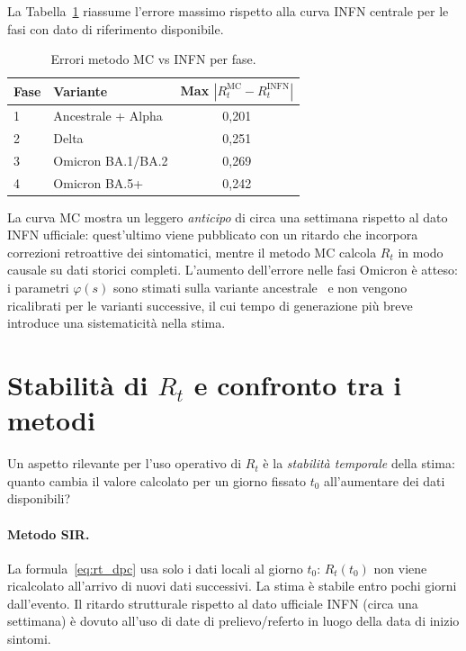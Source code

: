 \documentclass[12pt, a4paper]{article}
\begin{document}
La Tabella~\ref{tab:errori_mc} riassume l'errore massimo rispetto alla curva INFN
centrale per le fasi con dato di riferimento disponibile.

\begin{table}[htbp]
\centering
\caption{Errori metodo MC vs INFN per fase.}
\label{tab:errori_mc}
\begin{tabular}{llc}
\toprule
\textbf{Fase} & \textbf{Variante} & \textbf{Max $|R_t^{\text{MC}} - R_t^{\text{INFN}}|$} \\
\midrule
1 & Ancestrale + Alpha & 0{,}201 \\
2 & Delta              & 0{,}251 \\
3 & Omicron BA.1/BA.2  & 0{,}269 \\
4 & Omicron BA.5+      & 0{,}242 \\
\bottomrule
\end{tabular}
\end{table}

\noindent
La curva MC mostra un leggero \emph{anticipo} di circa una settimana rispetto al dato INFN
ufficiale: quest'ultimo viene pubblicato con un ritardo che incorpora correzioni retroattive
dei sintomatici, mentre il metodo MC calcola $R_t$ in modo causale su dati storici completi.
L'aumento dell'errore nelle fasi Omicron è atteso: i parametri $\varphi(s)$ sono stimati
sulla variante ancestrale~\cite{Guzzetta2020} e non vengono ricalibrati per le varianti
successive, il cui tempo di generazione più breve introduce una sistematicità nella stima.


\section{Stabilità di \texorpdfstring{$R_t$}{Rt} e confronto tra i metodi}
\label{sec:stabilita}

Un aspetto rilevante per l'uso operativo di $R_t$ è la \emph{stabilità temporale} della stima:
quanto cambia il valore calcolato per un giorno fissato $t_0$ all'aumentare dei dati disponibili?

\paragraph{Metodo SIR.}
La formula~\eqref{eq:rt_dpc} usa solo i dati locali al giorno $t_0$: $R_t(t_0)$ non viene
ricalcolato all'arrivo di nuovi dati successivi.
La stima è stabile entro pochi giorni dall'evento.
Il ritardo strutturale rispetto al dato ufficiale INFN (circa una settimana) è dovuto
all'uso di date di prelievo/referto in luogo della data di inizio sintomi.
\end{document}
